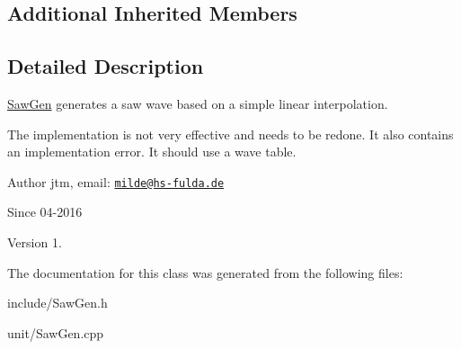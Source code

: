 \subsection*{Additional Inherited Members}


\subsection{Detailed Description}
\hyperlink{classunit_1_1SawGen}{Saw\+Gen} generates a saw wave based on a simple linear interpolation.

The implementation is not very effective and needs to be redone. It also contains an implementation error. It should use a wave table.

\begin{DoxyAuthor}{Author}
jtm, email\+:  \href{mailto:milde@hs-fulda.de}{\tt milde@hs-\/fulda.\+de} 
\end{DoxyAuthor}
\begin{DoxySince}{Since}
04-\/2016 
\end{DoxySince}
\begin{DoxyVersion}{Version}
1. 
\end{DoxyVersion}


The documentation for this class was generated from the following files\+:\begin{DoxyCompactItemize}
\item 
include/Saw\+Gen.\+h\item 
unit/Saw\+Gen.\+cpp\end{DoxyCompactItemize}

